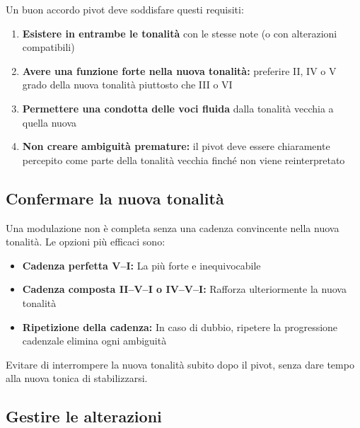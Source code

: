\begin{regola}
	\label{reg:scelta_pivot}
	Un buon accordo pivot deve soddisfare questi requisiti:
	
	\begin{enumerate}
		\item \textbf{Esistere in entrambe le tonalità} con le stesse note (o con alterazioni compatibili)
		\item \textbf{Avere una funzione forte nella nuova tonalità:} preferire II, IV o V grado della nuova tonalità piuttosto che III o VI
		\item \textbf{Permettere una condotta delle voci fluida} dalla tonalità vecchia a quella nuova
		\item \textbf{Non creare ambiguità premature:} il pivot deve essere chiaramente percepito come parte della tonalità vecchia finché non viene reinterpretato
	\end{enumerate}
\end{regola}

\subsection{Confermare la nuova tonalità}
\label{subsec:conferma_tonalita}

\begin{regola}
	\label{reg:conferma_cadenza}
	Una modulazione non è completa senza una cadenza convincente nella nuova tonalità. Le opzioni più efficaci sono:
	
	\begin{itemize}
		\item \textbf{Cadenza perfetta V--I:} La più forte e inequivocabile
		\item \textbf{Cadenza composta II--V--I o IV--V--I:} Rafforza ulteriormente la nuova tonalità
		\item \textbf{Ripetizione della cadenza:} In caso di dubbio, ripetere la progressione cadenzale elimina ogni ambiguità
	\end{itemize}
	
	Evitare di interrompere la nuova tonalità subito dopo il pivot, senza dare tempo alla nuova tonica di stabilizzarsi.
\end{regola}

\subsection{Gestire le alterazioni}
\label{subsec:gestione_alterazioni}

